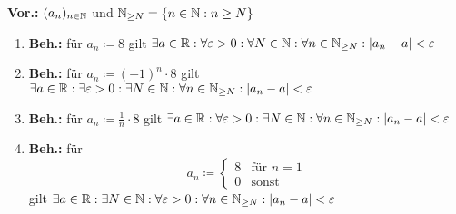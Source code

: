 \documentclass{gadsescript}
\begin{document}
\maketitle

\textbf{Vor.:} $ (a_n)_{n\in\mathbb{N}} $ und $ \mathbb{N}_{\ge N} = \{ n \in \mathbb{N} : n \geq N \} $\\
\begin{enumerate}[label=(\arabic*)]
	\item \textbf{Beh.:} für $ a_n \coloneqq 8 $ gilt $ \exists a \in \mathbb{R} : \forall \varepsilon > 0 : \forall N \in \mathbb{N} : \forall n \in \mathbb{N}_{\geq N} : |a_n - a| < \varepsilon $
	\item \textbf{Beh.:} für $ a_n \coloneqq (-1)^n \cdot 8 $ gilt $ \exists a \in \mathbb{R} : \exists \varepsilon > 0 : \exists N \in \mathbb{N} : \forall n \in \mathbb{N}_{\geq N} : |a_n - a| < \varepsilon $
	\item \textbf{Beh.:} für $ a_n \coloneqq \frac{1}{n} \cdot 8 $ gilt $ \exists a \in \mathbb{R} : \forall \varepsilon > 0 : \exists N \in \mathbb{N} : \forall n \in \mathbb{N}_{\geq N} : |a_n - a| < \varepsilon $
	\item \textbf{Beh.:} für
		\[ a_n \coloneqq
		\begin{cases}
		8 & \text{für } n = 1\\
		0 & \text{sonst}\end{cases} 
		\]
		gilt $ \exists a \in \mathbb{R} : \exists N \in \mathbb{N} : \forall \varepsilon > 0 : \forall n \in \mathbb{N}_{\geq N} : |a_n - a| < \varepsilon $
\end{enumerate}
\end{document}
